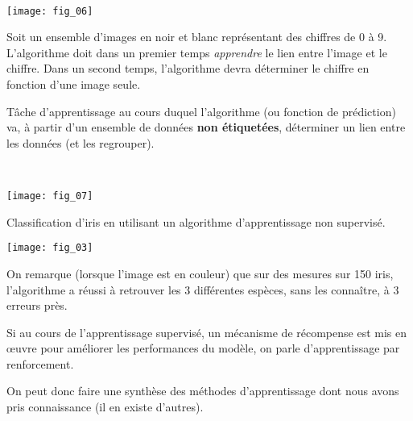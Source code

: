 \begin{exemple}~\\

\begin{center}
\texttt{[image: fig\_06]}
\end{center}
\end{exemple}


\begin{exemple}
Soit un ensemble d'images en noir et blanc représentant des chiffres de 0 à 9. L'algorithme doit dans un premier temps \textit{apprendre} le lien entre l'image et le chiffre. 
Dans un second temps, l'algorithme devra déterminer le chiffre en fonction d'une image seule.
\end{exemple}

\begin{defi}
Tâche d'apprentissage au cours duquel l'algorithme (ou fonction de prédiction) va, à partir d'un ensemble de données \textbf{non étiquetées}, déterminer un lien entre les données (et les regrouper). 
\end{defi}



\begin{exemple} ~\\


\begin{center}
\texttt{[image: fig\_07]}
\end{center}


Classification d'iris en utilisant un algorithme d'apprentissage non supervisé.
\begin{center}
\texttt{[image: fig\_03]}
\end{center}

On remarque (lorsque l'image est en couleur) que sur des mesures sur 150 iris, l'algorithme a réussi à retrouver les 3 différentes espèces, sans les connaître, à 3 erreurs près.

\end{exemple}


\begin{defi}
Si au cours de l'apprentissage supervisé, un mécanisme de récompense est mis en \oe{}uvre pour améliorer les performances du modèle, on parle d'apprentissage par renforcement.
\end{defi}



On peut donc faire une synthèse des méthodes d'apprentissage dont nous avons pris connaissance (il en existe d'autres).

